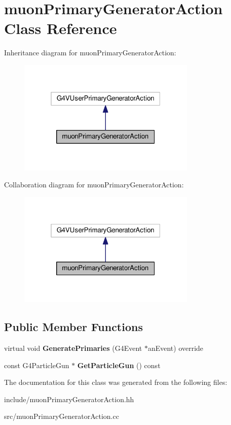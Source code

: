 \hypertarget{classmuonPrimaryGeneratorAction}{}\section{muon\+Primary\+Generator\+Action Class Reference}
\label{classmuonPrimaryGeneratorAction}


Inheritance diagram for muon\+Primary\+Generator\+Action\+:\nopagebreak
\begin{figure}[H]
\begin{center}
\leavevmode
\includegraphics[width=241pt]{classmuonPrimaryGeneratorAction__inherit__graph}
\end{center}
\end{figure}


Collaboration diagram for muon\+Primary\+Generator\+Action\+:\nopagebreak
\begin{figure}[H]
\begin{center}
\leavevmode
\includegraphics[width=241pt]{classmuonPrimaryGeneratorAction__coll__graph}
\end{center}
\end{figure}
\subsection*{Public Member Functions}
\begin{DoxyCompactItemize}
\item 
\mbox{\label{classmuonPrimaryGeneratorAction_a885d97924b9fcb69292c33eafb314c60}} 
virtual void {\bfseries Generate\+Primaries} (G4\+Event $\ast$an\+Event) override
\item 
\mbox{\label{classmuonPrimaryGeneratorAction_a2a8edec5c700a748aefbd2ec2a95157a}} 
const G4\+Particle\+Gun $\ast$ {\bfseries Get\+Particle\+Gun} () const
\end{DoxyCompactItemize}


The documentation for this class was generated from the following files\+:\begin{DoxyCompactItemize}
\item 
include/muon\+Primary\+Generator\+Action.\+hh\item 
src/muon\+Primary\+Generator\+Action.\+cc\end{DoxyCompactItemize}
